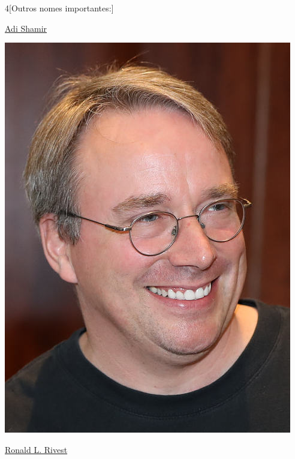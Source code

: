\begin{multicols}{4}[Outros nomes importantes:]
\vfill\null
\columnbreak				
				
				\href{https://pt.wikipedia.org/wiki/Adi_Shamir}{Adi Shamir}
				
\begin{center}
					\includegraphics[width=.8\columnwidth]{./IMG-GIT/CIENTISTAS/linus.jpeg}
\end{center}
				
\vfill\null
\columnbreak				
				
				\href{https://pt.wikipedia.org/wiki/Ronald_L._Rivest}{Ronald L. Rivest}
				

\end{multicols}
